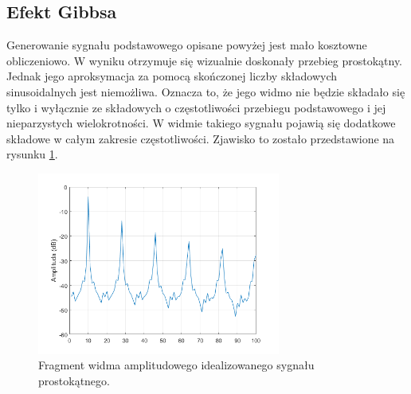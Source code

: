 \subsection{Efekt Gibbsa}
Generowanie sygnału podstawowego opisane powyżej jest mało kosztowne obliczeniowo. W wyniku otrzymuje się wizualnie doskonały przebieg prostokątny. Jednak jego aproksymacja za pomocą skończonej liczby składowych sinusoidalnych jest niemożliwa. Oznacza to, że jego widmo nie będzie składało się tylko i wyłącznie ze składowych o częstotliwości przebiegu podstawowego i jej nieparzystych wielokrotności. 
W widmie takiego sygnału pojawią się dodatkowe składowe w całym zakresie częstotliwości. Zjawisko to zostało przedstawione na rysunku \ref{rys:sub_gibbs1}.
\begin{figure}[H]
	\centering
	\includegraphics[width=8cm]{grafiki/sub_gibbs1}
	\captionsetup{justification=centering}
	\caption{Fragment widma amplitudowego idealizowanego sygnału prostokątnego.}
	\label{rys:sub_gibbs1}
\end{figure}

